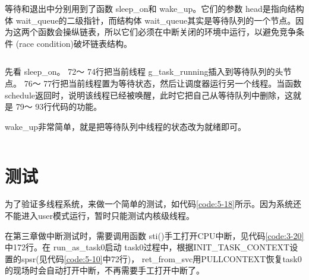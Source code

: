 \documentclass[main.tex]{subfiles}
\begin{document}
\begin{CJK*}{UTF8}{song}
\begin{code}
\label{code:5-15}
\inputminted[firstline=224,lastline=265,linenos,numbersep=5pt,frame=lines,framesep=2mm]{c}{src/chapter05/kernel/task.c}
\end{code}

等待和退出中分别用到了函数 sleep\_\-on和 wake\_\-up。它们的参数 head是指向结构体 wait\_\-queue的二级指针，而结构体 wait\_\-queue其实是等待队列的一个节点。因为这两个函数会操纵链表，所以它们必须在中断关闭的环境中运行，以避免竞争条件 (race condition)破坏链表结构。

\begin{code}
\label{code:5-16}
\inputminted[firstline=120,lastline=123,linenos,numbersep=5pt,frame=lines,framesep=2mm]{c}{src/chapter05/kernel/kernel.h}
\end{code}

先看 sleep\_\-on。 72～ 74行把当前线程 g\_\-task\_\-running插入到等待队列的头节点。 76～ 77行把当前线程置为等待状态，然后让调度器运行另一个线程。当函数 schedule返回时，说明该线程已经被唤醒，此时它把自己从等待队列中删除，这就是 79～ 93行代码的功能。

\par
 wake\_\-up非常简单，就是把等待队列中线程的状态改为就绪即可。
 
\begin{code}
\label{code:5-17}
\inputminted[firstline=63,lastline=108,linenos,numbersep=5pt,frame=lines,framesep=2mm]{c}{src/chapter05/kernel/task.c}
\end{code}

\section{测试}
为了验证多线程系统，来做一个简单的测试，如代码\ref{code:5-18}所示。因为系统还不能进入user模式运行，暂时只能测试内核级线程。

\par
在第三章做中断测试时，需要调用函数 sti()手工打开CPU中断，见代码\ref{code:3-20}中172行。在 run\_\-as\_\-task0启动 task0过程中，根据INIT\_\-TASK\_\-CONTEXT设置的spsr(见代码\ref{code:5-10}中72行)， ret\_\-from\_\-svc用PULL\-CONTEXT恢复task0的现场时会自动打开中断，不再需要手工打开中断了。

\begin{code}
\label{code:5-18}
\inputminted[firstline=501,lastline=537,linenos,numbersep=5pt,frame=lines,framesep=2mm]{c}{src/chapter05/kernel/machdep.c}
\end{code}


\end{CJK*}
\end{document}
